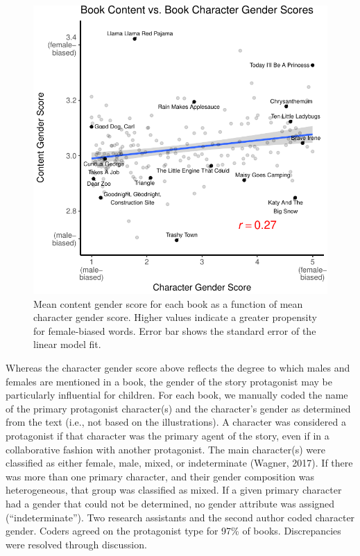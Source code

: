 \documentclass[english,,man,floatsintext]{apa6}
\begin{document}
\begin{figure}[t!]
\includegraphics{kidbookgender_files/figure-latex/charactercontentplot-1} \caption{Mean content gender score for each book as a function of mean character gender score. Higher values indicate a greater propensity for female-biased words. Error bar shows the standard error of the linear model fit.}\label{fig:charactercontentplot}
\end{figure}

Whereas the character gender score above reflects the degree to which males and females are mentioned in a book, the gender of the story protagonist may be particularly influential for children. For each book, we manually coded the name of the primary protagonist character(s) and the character's gender as determined from the text (i.e., not based on the illustrations). A character was considered a protagonist if that character was the primary agent of the story, even if in a collaborative fashion with another protagonist. The main character(s) were classified as either female, male, mixed, or indeterminate (Wagner, 2017). If there was more than one primary character, and their gender composition was heterogeneous, that group was classified as mixed. If a given primary character had a gender that could not be determined, no gender attribute was assigned (\enquote{indeterminate}). Two research assistants and the second author coded character gender. Coders agreed on the protagonist type for 97\% of books. Discrepancies were resolved through discussion.
\end{document}
